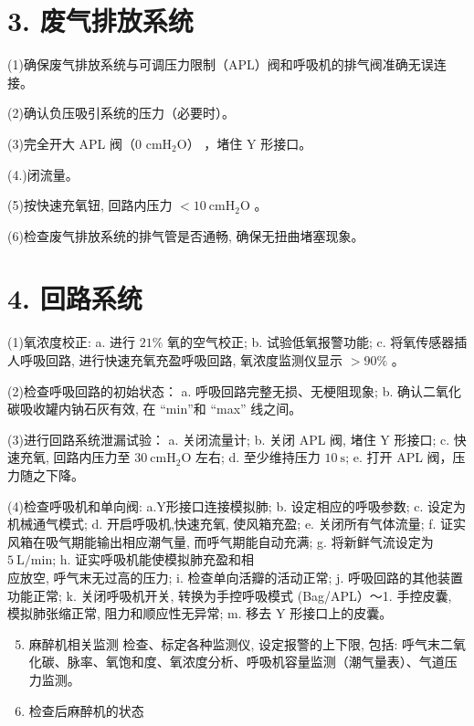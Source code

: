\documentclass[10pt]{article}
\begin{document}
\section*{3. 废气排放系统}
(1)确保废气排放系统与可调压力限制（APL）阀和呼吸机的排气阀准确无误连接。

(2)确认负压吸引系统的压力（必要时）。

(3)完全开大 APL 阀（0 $\mathrm{cm} \mathrm{H}_{2} \mathrm{O} ）$ ，堵住 $\mathrm{Y}$ 形接口。

(4.)闭流量。

(5)按快速充氧钮, 回路内压力 $<10 \mathrm{~cm} \mathrm{H}_{2} \mathrm{O}$ 。

(6)检查废气排放系统的排气管是否通畅, 确保无扭曲堵塞现象。

\section*{4. 回路系统}
(1)氧浓度校正: a. 进行 $21 \%$ 氧的空气校正; b. 试验低氧报警功能; c. 将氧传感器插人呼吸回路, 进行快速充氧充盈呼吸回路, 氧浓度监测仪显示 $>90 \%$ 。

(2)检查呼吸回路的初始状态： a. 呼吸回路完整无损、无梗阻现象; b. 确认二氧化碳吸收罐内钠石灰有效, 在 “min”和 “max” 线之间。

(3)进行回路系统泄漏试验： a. 关闭流量计; b. 关闭 APL 阀, 堵住 $\mathrm{Y}$ 形接口; c. 快速充氧, 回路内压力至 $30 \mathrm{~cm} \mathrm{H}_{2} \mathrm{O}$ 左右; d. 至少维持压力 $10 \mathrm{~s}$; e. 打开 APL 阀，压力随之下降。

(4)检查呼吸机和单向阀: a.Y形接口连接模拟肺; b. 设定相应的呼吸参数; c. 设定为机械通气模式; d. 开启呼吸机,快速充氧, 使风箱充盈; e. 关闭所有气体流量; f. 证实风箱在吸气期能输出相应潮气量, 而呼气期能自动充满; g. 将新鲜气流设定为 $5 \mathrm{~L} / \mathrm{min}$; h. 证实呼吸机能使模拟肺充盈和相\\
应放空, 呼气末无过高的压力; i. 检查单向活瓣的活动正常; j. 呼吸回路的其他装置功能正常; k. 关闭呼吸机开关, 转换为手控呼吸模式 (Bag/APL）～1. 手控皮囊, 模拟肺张缩正常, 阻力和顺应性无异常; m. 移去 Y 形接口上的皮囊。

\begin{enumerate}
  \setcounter{enumi}{4}
  \item 麻醉机相关监测 检查、标定各种监测仪, 设定报警的上下限, 包括: 呼气末二氧化碳、脉率、氧饱和度、氧浓度分析、呼吸机容量监测（潮气量表）、气道压力监测。

  \item 检查后麻醉机的状态

\end{enumerate}
\end{document}
